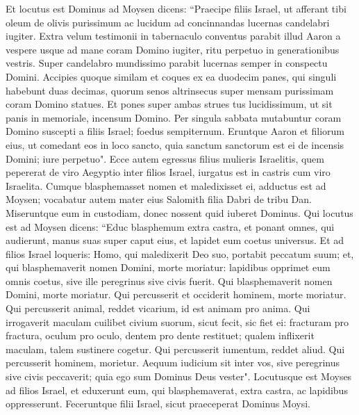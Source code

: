 \begin{biblechapter}  
\verse Et locutus est Dominus ad Moysen dicens: 
\verse “Praecipe filiis Israel, ut afferant tibi oleum de olivis purissimum ac lucidum ad concinnandas lucernas candelabri iugiter. 
\verse Extra velum testimonii in tabernaculo conventus parabit illud Aaron a vespere usque ad mane coram Domino iugiter, ritu perpetuo in generationibus vestris. 
\verse Super candelabro mundissimo parabit lucernas semper in conspectu Domini. 
\verse Accipies quoque similam et coques ex ea duodecim panes, qui singuli habebunt duas decimas, 
\verse quorum senos altrinsecus super mensam purissimam coram Domino statues. 
\verse Et pones super ambas strues tus lucidissimum, ut sit panis in memoriale, incensum Domino. 
\verse Per singula sabbata mutabuntur coram Domino suscepti a filiis Israel; foedus sempiternum. 
\verse Eruntque Aaron et filiorum eius, ut comedant eos in loco sancto, quia sanctum sanctorum est ei de incensis Domini; iure perpetuo". 
\verse Ecce autem egressus filius mulieris Israelitis, quem pepererat de viro Aegyptio inter filios Israel, iurgatus est in castris cum viro Israelita. 
\verse Cumque blasphemasset nomen et maledixisset ei, adductus est ad Moysen; vocabatur autem mater eius Salomith filia Dabri de tribu Dan. 
\verse Miseruntque eum in custodiam, donec nossent quid iuberet Dominus. 
\verse Qui locutus est ad Moysen dicens: 
\verse “Educ blasphemum extra castra, et ponant omnes, qui audierunt, manus suas super caput eius, et lapidet eum coetus universus. 
\verse Et ad filios Israel loqueris: Homo, qui maledixerit Deo suo, portabit peccatum suum; 
\verse et, qui blasphemaverit nomen Domini, morte moriatur: lapidibus opprimet eum omnis coetus, sive ille peregrinus sive civis fuerit. Qui blasphemaverit nomen Domini, morte moriatur. 
\verse Qui percusserit et occiderit hominem, morte moriatur. 
\verse Qui percusserit animal, reddet vicarium, id est animam pro anima. 
\verse Qui irrogaverit maculam cuilibet civium suorum, sicut fecit, sic fiet ei:  
\verse fracturam pro fractura, oculum pro oculo, dentem pro dente restituet; qualem inflixerit maculam, talem sustinere cogetur. 
\verse Qui percusserit iumentum, reddet aliud. Qui percusserit hominem, morietur.  
\verse Aequum iudicium sit inter vos, sive peregrinus sive civis peccaverit; quia ego sum Dominus Deus vester". 
\verse Locutusque est Moyses ad filios Israel, et eduxerunt eum, qui blasphemaverat, extra castra, ac lapidibus oppresserunt. Feceruntque filii Israel, sicut praeceperat Dominus Moysi. 
\end{biblechapter}

